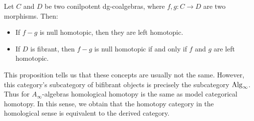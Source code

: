 \documentclass[../thesis.tex]{subfiles}
\begin{document}
    \begin{proposition}
        Let $C$ and $D$ be two conilpotent dg-coalgebras, where $f,g: C \rightarrow D$ are two morphisms. Then:
        \begin{itemize}
            \item If $f-g$ is null homotopic, then they are left homotopic.
            \item If $D$ is fibrant, then $f-g$ is null homotopic if and only if $f$ and $g$ are left homotopic.
        \end{itemize}
    \end{proposition}
    
    This proposition tells us that these concepts are usually not the same. However, this category's subcategory of bifibrant objects is precisely the subcategory $\tt{Alg}_\infty$. Thus for $A_\infty$-algebras homological homotopy is the same as model categorical homotopy. In this sense, we obtain that the homotopy category in the homological sense is equivalent to the derived category.
\end{document}
